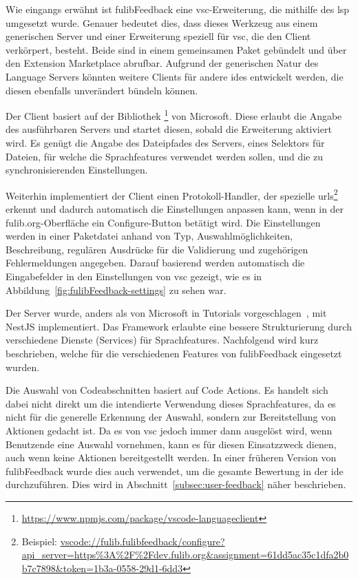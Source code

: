 Wie eingangs erwähnt ist fulibFeedback eine \ac{vsc}-Erweiterung, die mithilfe des \ac{lsp} umgesetzt wurde.
Genauer bedeutet dies, dass dieses Werkzeug aus einem generischen Server und einer Erweiterung speziell für \ac{vsc}, die den Client verkörpert, besteht.
Beide sind in einem gemeinsamen Paket gebündelt und über den Extension Marketplace abrufbar.
Aufgrund der generischen Natur des Language Servers könnten weitere Clients für andere \acp{ide} entwickelt werden, die diesen ebenfalls unverändert bündeln können.

Der Client basiert auf der Bibliothek \footnote{
    \url{https://www.npmjs.com/package/vscode-languageclient}
} von Microsoft.
Diese erlaubt die Angabe des ausführbaren Servers und startet diesen, sobald die Erweiterung aktiviert wird.
Es genügt die Angabe des Dateipfades des Servers, eines Selektors für Dateien, für welche die Sprachfeatures verwendet werden sollen, und die zu synchronisierenden Einstellungen.

Weiterhin implementiert der Client einen Protokoll-Handler, der spezielle \acp{url}\footnote{
    Beispiel: \url{vscode://fulib.fulibfeedback/configure?api_server=https\%3A\%2F\%2Fdev.fulib.org&assignment=61dd5ac35c1dfa2b0b7c7898&token=1b3a-0558-29d1-6dd3}
} erkennt und dadurch automatisch die Einstellungen anpassen kann, wenn in der fulib.org-Oberfläche ein Configure-Button betätigt wird.
Die Einstellungen werden in einer Paketdatei anhand von Typ, Auswahlmöglichkeiten, Beschreibung, regulären Ausdrücke für die Validierung und zugehörigen Fehlermeldungen angegeben.
Darauf basierend werden automatisch die Eingabefelder in den Einstellungen von \ac{vsc} gezeigt, wie es in Abbildung~\ref{fig:fulibFeedback-settings} zu sehen war.

Der Server wurde, anders als von Microsoft in Tutorials vorgeschlagen~\cite{vsc-language-server-guide}, mit NestJS implementiert.
Das Framework erlaubte eine bessere Strukturierung durch verschiedene Dienste (Services) für Sprachfeatures.
Nachfolgend wird kurz beschrieben, welche für die verschiedenen Features von fulibFeedback eingesetzt wurden.

Die Auswahl von Codeabschnitten basiert auf Code Actions.
Es handelt sich dabei nicht direkt um die intendierte Verwendung dieses Sprachfeatures, da es nicht für die generelle Erkennung der Auswahl, sondern zur Bereitstellung von Aktionen gedacht ist.
Da es von \ac{vsc} jedoch immer dann ausgelöst wird, wenn Benutzende eine Auswahl vornehmen, kann es für diesen Einsatzzweck dienen, auch wenn keine Aktionen bereitgestellt werden.
In einer früheren Version von fulibFeedback wurde dies auch verwendet, um die gesamte Bewertung in der \ac{ide} durchzuführen.
Dies wird in Abschnitt~\ref{subsec:user-feedback} näher beschrieben.

